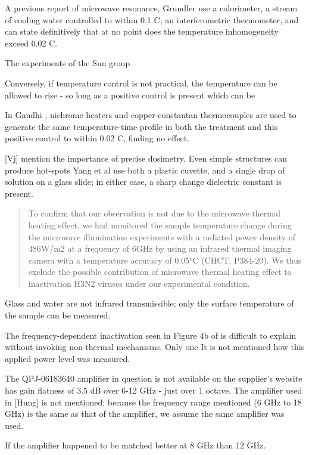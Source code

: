\documentclass[paper.tex]{subfiles}
\begin{document}
\begin{multicols}{1}
A previous report of microwave resonance, Grundler \cite{Sharp1983} use a calorimeter, a stream of cooling water controlled to within 0.1 C, an interferometric thermometer, and can state definitively that at no point does the temperature inhomogeneity exceed 0.02 C.

The experiments of the Sun group 

Conversely, if temperature control is not practical, the temperature can be allowed to rise - so long as a positive control is present which can be  

In Gandhi \cite{Basic1983}, nichrome heaters and copper-constantan thermocouples are used to generate the same temperature-time profile in both the treatment and this positive control to within 0.02 C, finding no effect. 


[Vj] mention the importance of precise dosimetry. Even simple structures can produce hot-spots 
Yang et al use both a plastic cuvette, and a single drop of solution on a glass slide; in either case, a sharp change dielectric constant is present.

\begin{quote}
	To confirm that our observation is not due to the microwave thermal heating effect, we had monitored the sample temperature change during the microwave illumination experiments with a radiated power density of 486W/m2 at a frequency of 6GHz by using an infrared thermal imaging camera with a temperature accuracy of 0.05°C (CHCT, P384-20).  We thus exclude the possible contribution of microwave thermal heating effect to inactivation H3N2 viruses under our experimental condition.
\end{quote}

Glass and water are not infrared transmissible; only the surface temperature of the sample can be measured. 

The frequency-dependent inactivation seen in Figure 4b of \cite{Efficient2015} is difficult to explain without invoking non-thermal mechanisms. Only one  It is not mentioned how this applied power level was measured. 

The QPJ-06183640 amplifier in question is not available on the supplier's website \cite{Microwaved} has gain flatness of 3.5 dB over 6-12 GHz - just over 1 octave. The amplifier used in [Hung] is not mentioned; because the frequency range mentioned (6 GHz to 18 GHz) is the same as that of the amplifier, we assume the same amplifier was used. 

If the amplifier happened to be matched better at 8 GHz than 12 GHz.


\end{multicols}
\end{document}
